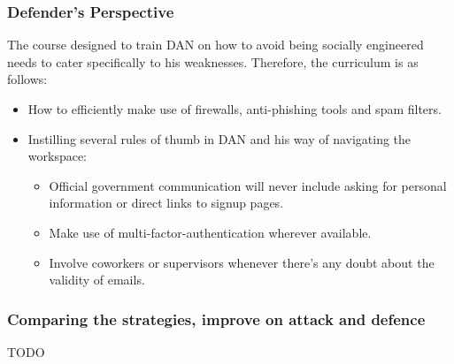 \subsubsection{Defender's Perspective}
The course designed to train DAN on how to avoid being socially engineered needs to cater specifically to his weaknesses. Therefore, the curriculum is as follows:
\begin{itemize}
    \item How to efficiently make use of firewalls, anti-phishing tools and spam filters.
    \item Instilling several rules of thumb in DAN and his way of navigating the workspace:
          \begin{itemize}
              \item Official government communication will never include asking for personal information or direct links to signup pages.
              \item Make use of multi-factor-authentication wherever available.
              \item Involve coworkers or supervisors whenever there's any doubt about the validity of emails.
          \end{itemize}
\end{itemize}

\subsubsection{Comparing the strategies, improve on attack and defence}
TODO